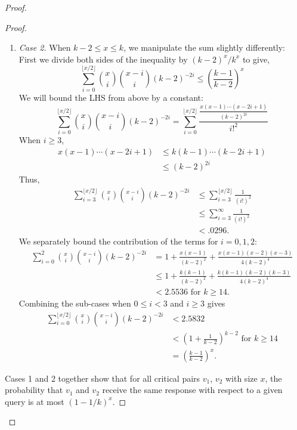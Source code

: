 \documentclass[12pt, a4paper]{article}
\begin{document}
\begin{proof}
\begin{proof}
\begin{enumerate}[label=]
            \item\textit{Case 2.} When $k-2 \leq x \leq k$, we manipulate the sum
            slightly differently: First we divide both sides of the inequality by
            $(k-2)^x/k^x$ to give,
            	\begin{equation*}
				\sum_{i=0}^{\lfloor x/2 \rfloor} \binom{x}{i}\binom{x-i}{i}(k-2)^{-2i}
				\le \left(\frac{k-1}{k-2}\right)^x
				\end{equation*}
			We will bound the LHS from above by a constant:
                \begin{equation*}
                \sum_{i=0}^{\lfloor x/2 \rfloor} \binom{x}{i}\binom{x-i}{i}(k-2)^{-2i}
                =\sum_{i=0}^{\lfloor x/2 \rfloor} \frac{\frac{x(x-1)
                \cdots(x-2i+1)}{(k-2)^{2i}}}{i!^2}
                \end{equation*}
            When $i\ge 3$,
            	\begin{align*}
				x(x-1)\cdots(x-2i+1) & \le k(k-1)\cdots(k-2i+1)\\
	            & \le(k-2)^{2i}
	            \end{align*}
            Thus, 
                \begin{align*}
                \sum_{i=3}^{\lfloor x/2 \rfloor} \binom{x}{i}\binom{x-i}{i}(k-2)^{-2i}
                & \le \sum_{i=3}^{\lfloor x/2 \rfloor} \frac{1}{(i!)^2}\\
                & \le \sum_{i=3}^\infty \frac{1}{(i!)^2}\\
                & < .0296.
                \end{align*}
            We separately bound the contribution of the terms for $i=0, 1, 2$:
                \begin{align*}
                \sum_{i=0}^{2} \binom{x}{i}\binom{x-i}{i}(k-2)^{-2i}
                & = 1+\frac{x(x-1)}{(k-2)^2}+\frac{x(x-1)(x-2)(x-3)}{4(k-2)^4} \\
                & \le 1+\frac{k(k-1)}{(k-2)^2}+\frac{k(k-1)(k-2)(k-3)}{4(k-2)^4} \\
                & < 2.5536 \text{ for } k\ge 14.
                \end{align*}
            Combining the sub-cases when $0\le i< 3$ and $i\ge 3$ gives
            	\begin{align*}
            	\sum_{i=0}^{\lfloor x/2 \rfloor} \binom{x}{i}\binom{x-i}{i}(k-2)^{-2i}
            	& < 2.5832 \\
            	& < \left(1+\frac{1}{k-2}\right)^{k-2} \text{ for } k\ge 14\\
            	& = \left(\frac{k-1}{k-2}\right)^{x}.
            	\end{align*}
			\end{enumerate}
		Cases 1 and 2 together show that for all critical pairs $v_1$, $v_2$ with
		size $x$, the probability that $v_1$ and $v_2$ receive the same response
		with respect to a given query is at most $(1-1/k)^x$.
		\end{proof}
    

\end{proof}
\end{document}

